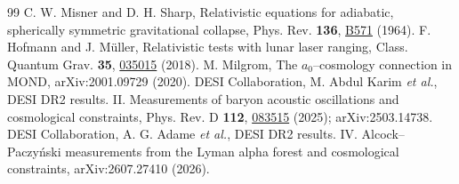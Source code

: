 \documentclass[aps,prd,twocolumn,superscriptaddress,nofootinbib,showkeys]{revtex4-2}
\begin{document}
\begin{thebibliography}{99}
 C. W. Misner and D. H. Sharp, Relativistic equations for adiabatic, spherically symmetric gravitational collapse, Phys. Rev. \textbf{136}, \href{https://doi.org/10.1103/PhysRev.136.B571}{B571} (1964).
 F. Hofmann and J. M\"uller, Relativistic tests with lunar laser ranging, Class. Quantum Grav. \textbf{35}, \href{https://doi.org/10.1088/1361-6382/aa8f7a}{035015} (2018).
 M. Milgrom, The $a_0$--cosmology connection in MOND, arXiv:2001.09729 (2020).
 DESI Collaboration, M. Abdul Karim \emph{et al.}, DESI DR2 results. II. Measurements of baryon acoustic oscillations and cosmological constraints, Phys. Rev. D \textbf{112}, \href{https://doi.org/10.1103/tr6y-kpc6}{083515} (2025); arXiv:2503.14738.
 DESI Collaboration, A. G. Adame \emph{et al.}, DESI DR2 results. IV. Alcock--Paczy\'nski measurements from the Lyman alpha forest and cosmological constraints, arXiv:2607.27410 (2026).
\end{thebibliography}
\end{document}
